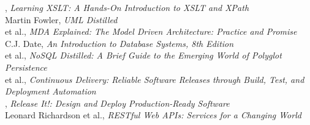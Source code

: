 \documentclass[nobrand,anonymous,nodate,nosecurity]{huawei}
\begin{document}
\begin{multicols}{2}
{}, \emph{Learning XSLT: A Hands-On Introduction to XSLT and XPath}\\[3pt]
{Martin Fowler}, \emph{UML Distilled}\\[3pt]
{ et al.}, \emph{MDA Explained: The Model Driven Architecture: Practice and Promise}\\[3pt]
{C.J. Date}, \emph{An Introduction to Database Systems, 8th Edition}\\[3pt]
{ et al.}, \emph{NoSQL Distilled: A Brief Guide to the Emerging World of Polyglot Persistence}\\[3pt]
{ et al.}, \emph{Continuous Delivery: Reliable Software Releases through Build, Test, and Deployment Automation}\\[3pt]
{}, \emph{Release It!: Design and Deploy Production-Ready Software}\\[3pt]
{Leonard Richardson et al.}, \emph{RESTful Web APIs: Services for a Changing World}
\end{multicols}
\end{document}
